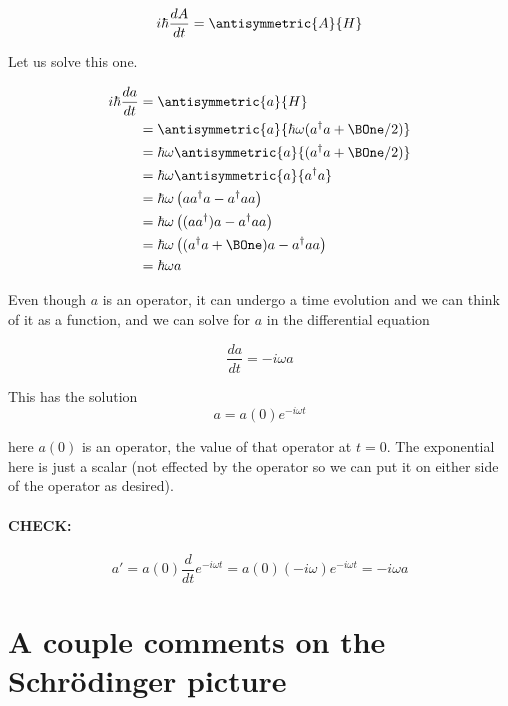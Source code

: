 \begin{equation}\label{eqn:PHY356FLecture11:270}
i \hbar \frac{d A}{dt} = \antisymmetric{ A }{H}
\end{equation}

Let us solve this one.

\begin{align*}
i \hbar \frac{d a}{dt}
&= \antisymmetric{ a }{H} \\
&= \antisymmetric{ a }{ \hbar \omega (a^\dagger a + \BOne/2) } \\
&= \hbar\omega \antisymmetric{ a }{ (a^\dagger a + \BOne/2) } \\
&= \hbar\omega \antisymmetric{ a }{ a^\dagger a } \\
&= \hbar\omega \left( a a^\dagger a - a^\dagger a a \right) \\
&= \hbar\omega \left( (a a^\dagger) a - a^\dagger a a \right) \\
&= \hbar\omega \left( (a^\dagger a + \BOne) a - a^\dagger a a \right) \\
&= \hbar\omega a
\end{align*}

Even though $a$ is an operator, it can undergo a time evolution and we can think of it as a function, and we can solve for $a$ in the differential equation

\begin{equation}\label{eqn:PHY356FLecture11:280}
\frac{d a}{dt} = -i \omega a
\end{equation}

This has the solution
\begin{equation}\label{eqn:PHY356FLecture11:290}
a = a(0) e^{-i \omega t}
\end{equation}

here $a(0)$ is an operator, the value of that operator at $t = 0$.  The exponential here is just a scalar (not effected by the operator so we can put it on either side of the operator as desired).

\paragraph{CHECK:}
\begin{equation}\label{eqn:PHY356FLecture11:291}
a' = a(0) \frac{d}{dt} e^{-i \omega t} = a(0) (-i \omega) e^{-i \omega t} = -i \omega a
\end{equation}

\section{A couple comments on the Schr\"{o}dinger picture}

